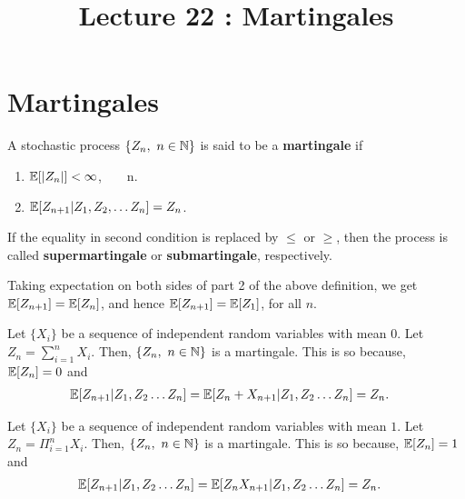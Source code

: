 \documentclass[a4paper,10pt,english]{article}
\title{Lecture 22 : Martingales}
\author{}
\begin{document}
\maketitle
\section{Martingales}
\begin{defn}
A stochastic process $\{Z_n,~n \in \mathbb{N} \}$ is said to be a \textbf{martingale} if 
\begin{enumerate}
\item $\mathbb{E}[|Z_n|]< \infty$, ~ ~ n.
\item $\mathbb{E}[Z_{n+1}|Z_1,Z_2, \hdots Z_n]=Z_n$.
\end{enumerate}
If the equality in second condition is replaced by $\leq$ or $\geq$, then the process is called \textbf{supermartingale} or \textbf{submartingale}, respectively.
\end{defn}
\begin{rem} Taking expectation on both sides of part 2 of the above definition, we get $\mathbb{E}[Z_{n+1}]=\mathbb{E}[Z_n]$, and hence $\mathbb{E}[Z_{n+1}]=\mathbb{E}[Z_1]$, for all $n$.
\end{rem}
\begin{exmp}
Let $\{X_i\}$ be a sequence of independent random variables with mean $0$. Let $Z_n=\sum_{i=1}^n X_i$. Then, $\{Z_n,~n \in \mathbb{N} \}$ is a martingale. This is so because, $\mathbb{E}[Z_n]=0$ and 
\begin{align*}
\mathbb{E}[Z_{n+1}|Z_1,Z_2 \hdots Z_n] =\mathbb{E}[Z_{n}+X_{n+1}|Z_1,Z_2 \hdots Z_n]
&=Z_n.
\end{align*} 
\end{exmp}
\begin{exmp}
Let $\{X_i\}$ be a sequence of independent random variables with mean $1$. Let $Z_n=\Pi_{i=1}^n X_i$. Then, $\{Z_n,~n \in \mathbb{N} \}$ is a martingale. This is so because, $\mathbb{E}[Z_n]=1$ and 
\begin{align*}
\mathbb{E}[Z_{n+1}|Z_1,Z_2 \hdots Z_n] =\mathbb{E}[Z_{n}X_{n+1}|Z_1,Z_2 \hdots Z_n]
&=Z_n.
\end{align*} 
\end{exmp}
\end{document}

